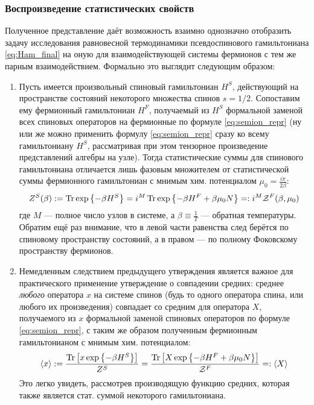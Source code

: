 \subsubsection{Воспроизведение статистических свойств}
Полученное представление даёт возможность взаимно однозначно отобразить задачу исследования равновесной термодинамики псевдоспинового гамильтониана \eqref{eq:Ham_final} на оную для взаимодействующей системы фермионов с тем же парным взаимодействием. Формально это выглядит следующим образом:
\begin{enumerate}
	\item Пусть имеется произвольный спиновый гамильтониан $H^S$, действующий на пространстве состояний некоторого множества спинов $s = 1/2$. Сопоставим ему фермионный гамильтониан $H^F$, получаемый из $H^S$ формальной заменой всех спиновых операторов на фермионные по формуле \eqref{eq:semion_repr} (ну или же можно применить формулу \eqref{eq:semion_repr} сразу ко всему гамильтониану $H^S$, рассматривая при этом тензорное произведение представлений алгебры на узле). Тогда статистические суммы для спинового гамильтониана отличается лишь фазовым множителем от статистической суммы фермионного гамильтониан с мнимым хим. потенциалом $\mu_0 = \frac{i \pi}{2 \beta}$:
	$$
	Z^S(\beta) := \operatorname{Tr} \exp \left\{-\beta H^S\right\} = i^M \operatorname{Tr} \exp \left\{ -\beta H^F + \beta \mu_0 N\right\} =: i^M \mathcal{Z}^F(\beta, \mu_0)
	$$
	где $M$ --- полное число узлов в системе, а $\beta \equiv \frac{1}{T}$ --- обратная температуры. Обратим ещё раз внимание, что в левой части равенства след берётся по спиновому пространству состояний, а в правом --- по полному Фоковскому пространству фермионов.
	\item Немедленным следствием предыдущего утверждения является важное для практического применение утверждение о совпадении средних: среднее \textit{любого} оператора $x$ на системе спинов (будь то одного оператора спина, или любого их произведения) совпадает со средним для оператора $X$, получаемого из $x$ формальной заменой спиновых операторов по формуле \eqref{eq:semion_repr}, с таким же образом полученным фермионным гамильтонианом с мнимым хим. потенциалом:
	\begin{equation}
		\label{eq:semion_mean_correspondence}
		\left\langle x \right\rangle := \frac{\operatorname{Tr}\left[ x \exp\left\{-\beta H^S\right \} \right]}{Z^S} =  \frac{\operatorname{Tr}\left[ X \exp\left\{-\beta H^F + \beta \mu_0 N\right\} \right]}{\mathcal{Z}^F} =: \left\langle X \right\rangle
	\end{equation}
	Это легко увидеть, рассмотрев производящую функцию средних, которая также является стат. суммой некоторого гамильтониана.
\end{enumerate}


